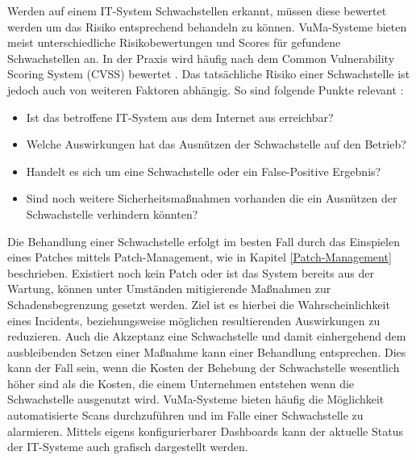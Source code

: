 \bigbreak
Werden auf einem IT-System Schwachstellen erkannt, müssen diese bewertet werden um das Risiko entsprechend behandeln zu können. VuMa-Systeme bieten meist unterschiedliche Risikobewertungen und Scores für gefundene Schwachstellen an. In der Praxis wird häufig nach dem \glqq{}Common Vulnerability Scoring System\grqq{} (CVSS) bewertet \autocite{CVSS}. Das tatsächliche Risiko einer Schwachstelle ist jedoch auch von weiteren Faktoren abhängig. 
\bigbreak
So sind folgende Punkte relevant \autocite{rapid7}:
\begin{itemize}
    \item Ist das betroffene IT-System aus dem Internet aus erreichbar?
    \item Welche Auswirkungen hat das Ausnützen der Schwachstelle auf den Betrieb?
    \item Handelt es sich um eine Schwachstelle oder ein False-Positive Ergebnis?
    \item Sind noch weitere Sicherheitsmaßnahmen vorhanden die ein Ausnützen der Schwachstelle verhindern könnten?
\end{itemize}
\bigbreak
Die Behandlung einer Schwachstelle erfolgt im besten Fall durch das Einspielen eines Patches mittels Patch-Management, wie in Kapitel \ref{Patch-Management} beschrieben. Existiert noch kein Patch oder ist das System bereits aus der Wartung, können unter Umständen mitigierende Maßnahmen zur Schadensbegrenzung gesetzt werden. Ziel ist es hierbei die Wahrscheinlichkeit eines Incidents, beziehungsweise möglichen resultierenden Auswirkungen zu reduzieren. Auch die Akzeptanz eine Schwachstelle und damit einhergehend dem ausbleibenden Setzen einer Maßnahme kann einer Behandlung entsprechen. Dies kann der Fall sein, wenn die Kosten der Behebung der Schwachstelle wesentlich höher sind als die Kosten, die einem Unternehmen entstehen wenn die Schwachstelle ausgenutzt wird. \autocite{rapid7}
\bigbreak
VuMa-Systeme bieten häufig die Möglichkeit automatisierte Scans durchzuführen und im Falle einer Schwachstelle zu alarmieren. Mittels eigens konfigurierbarer Dashboards kann der aktuelle Status der IT-Systeme auch grafisch dargestellt werden. 

